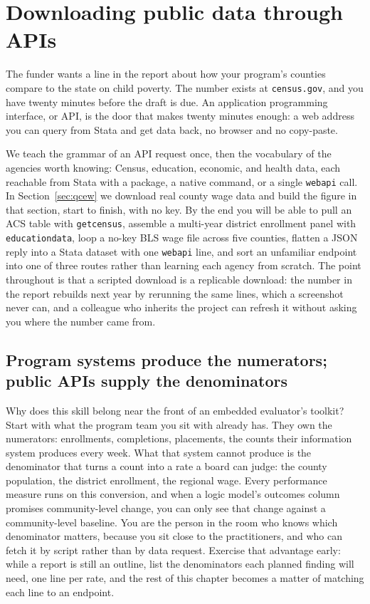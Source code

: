 \chapter{Downloading public data through APIs}\label{ch:apis}

The funder wants a line in the report about how your program's counties compare to the state on child poverty. The number exists at \texttt{census.gov}, and you have twenty minutes before the draft is due. An application programming interface, or API, is the door that makes twenty minutes enough: a web address you can query from Stata and get data back, no browser and no copy-paste.

We teach the grammar of an API request once, then the vocabulary of the agencies worth knowing: Census, education, economic, and health data, each reachable from Stata with a package, a native command, or a single \texttt{webapi} call. In Section~\ref{sec:qcew} we download real county wage data and build the figure in that section, start to finish, with no key. By the end you will be able to pull an ACS table with \texttt{getcensus}, assemble a multi-year district enrollment panel with \texttt{educationdata}, loop a no-key BLS wage file across five counties, flatten a JSON reply into a Stata dataset with one \texttt{webapi} line, and sort an unfamiliar endpoint into one of three routes rather than learning each agency from scratch. The point throughout is that a scripted download is a replicable download: the number in the report rebuilds next year by rerunning the same lines, which a screenshot never can, and a colleague who inherits the project can refresh it without asking you where the number came from.

\section{Program systems produce the numerators; public APIs supply the denominators}\label{ch03-advantage}
Why does this skill belong near the front of an embedded evaluator's toolkit? Start with what the program team you sit with already has. They own the numerators: enrollments, completions, placements, the counts their information system produces every week. What that system cannot produce is the denominator that turns a count into a rate a board can judge: the county population, the district enrollment, the regional wage. Every performance measure runs on this conversion, and when a logic model's outcomes column promises community-level change, you can only see that change against a community-level baseline. You are the person in the room who knows which denominator matters, because you sit close to the practitioners, and who can fetch it by script rather than by data request. Exercise that advantage early: while a report is still an outline, list the denominators each planned finding will need, one line per rate, and the rest of this chapter becomes a matter of matching each line to an endpoint.


